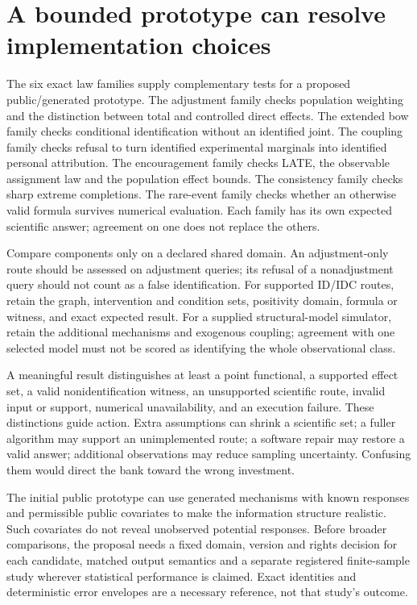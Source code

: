\section{A bounded prototype can resolve implementation choices}
\label{exec17:s3-design}

The six exact law families supply complementary tests
for a proposed public/generated prototype. The
adjustment family checks population weighting and
the distinction between total and controlled direct
effects. The extended bow family checks conditional
identification without an identified joint. The
coupling family checks refusal to turn identified
experimental marginals into identified personal
attribution. The encouragement family checks LATE,
the observable assignment law and the population
effect bounds. The consistency family checks sharp
extreme completions. The rare-event family checks
whether an otherwise valid formula survives numerical
evaluation. Each family has its own expected scientific
answer; agreement on one does not replace the
others.\citep{exec17_s3_exact,exec17_s3_decision,exec17_s3_design}

Compare components only on a declared shared domain.
An adjustment-only route should be assessed on
adjustment queries; its refusal of a nonadjustment
query should not count as a false identification.
For supported ID/IDC routes, retain the graph,
intervention and condition sets, positivity domain,
formula or witness, and exact expected result.
For a supplied structural-model simulator, retain
the additional mechanisms and exogenous coupling;
agreement with one selected model must not be scored
as identifying the whole observational class.

A meaningful result distinguishes at least a
point functional, a supported effect set, a valid
nonidentification witness, an unsupported scientific
route, invalid input or support, numerical
unavailability, and an execution failure.
These distinctions guide action. Extra assumptions
can shrink a scientific set; a fuller algorithm may
support an unimplemented route; a software repair
may restore a valid answer; additional observations
may reduce sampling uncertainty. Confusing them
would direct the bank toward the wrong investment.

The initial public prototype can use generated
mechanisms with known responses and permissible
public covariates to make the information
structure realistic. Such covariates do not reveal
unobserved potential responses. Before broader
comparisons, the proposal needs a fixed domain,
version and rights decision for each candidate,
matched output semantics and a separate registered
finite-sample study wherever statistical performance
is claimed. Exact identities and deterministic
error envelopes are a necessary reference, not
that study's outcome.\citep{exec17_s3_design}

